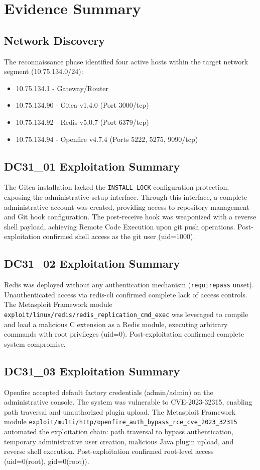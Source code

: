 \section{Evidence Summary}

\subsection{Network Discovery}

The reconnaissance phase identified four active hosts within the target network segment (10.75.134.0/24):
\begin{itemize}
    \item 10.75.134.1 - Gateway/Router
    \item 10.75.134.90 - Gitea v1.4.0 (Port 3000/tcp)
    \item 10.75.134.92 - Redis v5.0.7 (Port 6379/tcp)
    \item 10.75.134.94 - Openfire v4.7.4 (Ports 5222, 5275, 9090/tcp)
\end{itemize}

\subsection{DC31\_01 Exploitation Summary}

The Gitea installation lacked the \texttt{INSTALL\_LOCK} configuration protection, exposing the administrative setup interface. Through this interface, a complete administrative account was created, providing access to repository management and Git hook configuration. The post-receive hook was weaponized with a reverse shell payload, achieving Remote Code Execution upon git push operations. Post-exploitation confirmed shell access as the git user (uid=1000).

\subsection{DC31\_02 Exploitation Summary}

Redis was deployed without any authentication mechanism (\texttt{requirepass} unset). Unauthenticated access via redis-cli confirmed complete lack of access controls. The Metasploit Framework module \texttt{exploit/linux/redis/redis\_replication\_cmd\_exec} was leveraged to compile and load a malicious C extension as a Redis module, executing arbitrary commands with root privileges (uid=0). Post-exploitation confirmed complete system compromise.

\subsection{DC31\_03 Exploitation Summary}

Openfire accepted default factory credentials (admin/admin) on the administrative console. The system was vulnerable to CVE-2023-32315, enabling path traversal and unauthorized plugin upload. The Metasploit Framework module \texttt{exploit/multi/http/openfire\_auth\_bypass\_rce\_cve\_2023\_32315} automated the exploitation chain: path traversal to bypass authentication, temporary administrative user creation, malicious Java plugin upload, and reverse shell execution. Post-exploitation confirmed root-level access (uid=0(root), gid=0(root)).